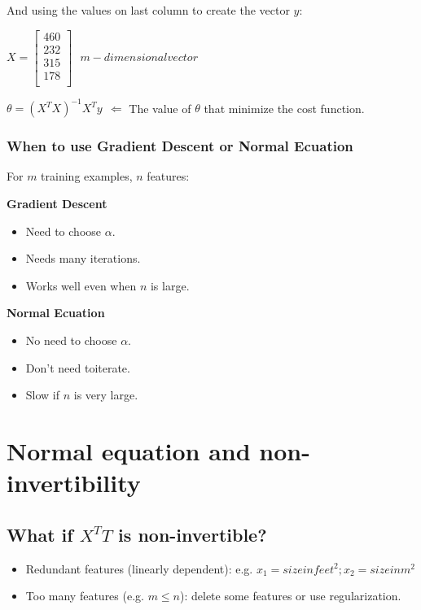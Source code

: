 \documentclass[a4paper]{report}
\begin{document}
          And using the values on last column to create the vector $y$:

          $X =
          \begin{bmatrix}
            460 \\
            232 \\
            315 \\
            178 \\
          \end{bmatrix} \ \ \ m-dimensional vector$

          $\theta = (X^{T}X)^{-1}X^{T}y \ \ \Leftarrow$ The value of $\theta$ that minimize the cost function.

        \subsubsection{When to use Gradient Descent or Normal Ecuation}

          For $m$ training examples, $n$ features:

          \textbf{Gradient Descent}
          \begin{itemize}
            \item Need to choose $\alpha$.
            \item Needs many iterations.
            \item Works well even when $n$ is large.
          \end{itemize}

          \textbf{Normal Ecuation}
          \begin{itemize}
            \item No need to choose $\alpha$.
            \item Don't need toiterate.
            \item Slow if $n$ is very large.
          \end{itemize}

    \section{Normal equation and non-invertibility}

      \subsection{What if $X^{T}T$ is non-invertible?}
        
        \begin{itemize}
          \item Redundant features (linearly dependent): e.g. $x_{1} = size in feet^{2}; x_{2} = size in m^{2}$
          \item Too many features (e.g. $m \leq n$): delete some features or use regularization.
        \end{itemize}
\end{document}
